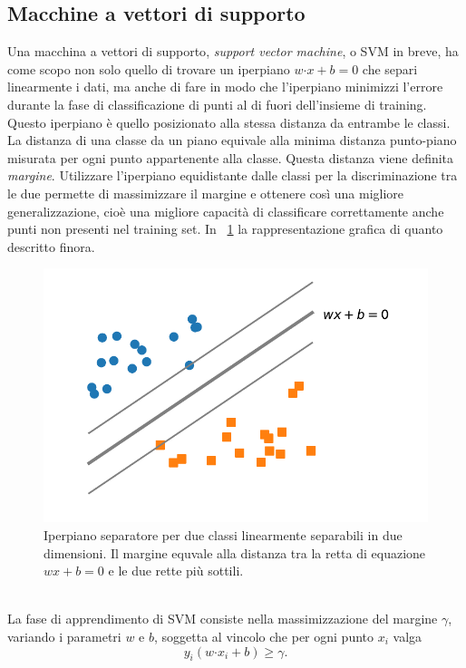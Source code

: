 \documentclass [11pt,a4paper,twoside,openright] {book}
\begin{document}
\subsection{Macchine a vettori di supporto}
Una macchina a vettori di supporto\cite{cortes1995support}, \textit{support vector machine}, o SVM in breve, ha come scopo non solo quello di trovare un iperpiano $w \boldsymbol{\cdot} x + b = 0$ che separi linearmente i dati, ma anche di fare in modo che l'iperpiano minimizzi l'errore durante la fase di classificazione di punti al di fuori dell'insieme di training. Questo iperpiano è quello posizionato alla stessa distanza da entrambe le classi. La distanza di una classe da un piano equivale alla minima distanza punto-piano misurata per ogni punto appartenente alla classe. Questa distanza viene definita \textit{margine}. Utilizzare l'iperpiano equidistante dalle classi per la discriminazione tra le due permette di massimizzare il margine e ottenere così una migliore generalizzazione, cioè una migliore capacità di classificare correttamente anche punti non presenti nel training set. In  \figurename~\ref{margine} la rappresentazione grafica di quanto descritto finora.
\begin{figure}[!h]
\centering
\includegraphics[scale=.6]{figure/margine.pdf}
\caption{Iperpiano separatore per due classi linearmente separabili in due dimensioni. Il margine equvale alla distanza tra la retta di equazione $wx + b = 0$ e le due rette più sottili.\label{margine}}
\end{figure}\\
La fase di apprendimento di SVM consiste nella massimizzazione del margine $\gamma$, variando i parametri $w$ e $b$, soggetta al vincolo che per ogni punto $x_i$ valga
\begin{equation}
y_i(w\boldsymbol{\cdot}x_i + b) \geq \gamma.
\end{equation}
\end{document}
